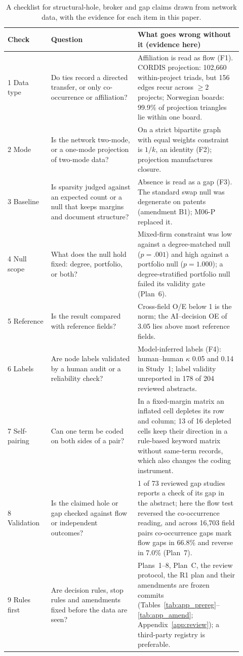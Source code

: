 \begin{table}[tbp]
  \centering
  \caption{A checklist for structural-hole, broker and gap claims drawn from network data, with the evidence for each item in this paper.}
  \label{tab:checklist}
  \footnotesize
  \renewcommand{\arraystretch}{1.15}
  \begin{tabular}{p{0.17\linewidth}p{0.34\linewidth}p{0.41\linewidth}}
    \toprule
    Check & Question & What goes wrong without it (evidence here) \\
    \midrule
    1 Data type & Do ties record a directed transfer, or only co-occurrence or affiliation? & Affiliation is read as flow (F1). CORDIS projection: 102,660 within-project triads, but 156 edges recur across $\geq 2$ projects; Norwegian boards: 99.9\% of projection triangles lie within one board. \\
    2 Mode & Is the network two-mode, or a one-mode projection of two-mode data? & On a strict bipartite graph with equal weights constraint is $1/k$, an identity (F2); projection manufactures closure. \\
    3 Baseline & Is sparsity judged against an expected count or a null that keeps margins and document structure? & Absence is read as a gap (F3). The standard swap null was degenerate on patents (amendment B1); M06-P replaced it. \\
    4 Null scope & What does the null hold fixed: degree, portfolio, or both? & Mixed-firm constraint was low against a degree-matched null ($p=.001$) and high against a portfolio null ($p=1.000$); a degree-stratified portfolio null failed its validity gate (Plan~6). \\
    5 Reference & Is the result compared with reference fields? & Cross-field O/E below 1 is the norm; the AI--decision OE of 3.05 lies above most reference fields. \\
    6 Labels & Are node labels validated by a human audit or a reliability check? & Model-inferred labels (F4): human--human $\kappa$ 0.05 and 0.14 in Study~1; label validity unreported in 178 of 204 reviewed abstracts. \\
    7 Self-pairing & Can one term be coded on both sides of a pair? & In a fixed-margin matrix an inflated cell depletes its row and column; 13 of 16 depleted cells keep their direction in a rule-based keyword matrix without same-term records, which also changes the coding instrument. \\
    8 Validation & Is the claimed hole or gap checked against flow or independent outcomes? & 1 of 73 reviewed gap studies reports a check of its gap in the abstract; here the flow test reversed the co-occurrence reading, and across 16,703 field pairs co-occurrence gaps mark flow gaps in 66.8\% and reverse in 7.0\% (Plan~7). \\
    9 Rules first & Are decision rules, stop rules and amendments fixed before the data are seen? & Plans~1--8, Plan~C, the review protocol, the R1 plan and their amendments are frozen commits (Tables~\ref{tab:app_prereg}--\ref{tab:app_amend}; Appendix~\ref{app:review}); a third-party registry is preferable. \\
    \bottomrule
  \end{tabular}
\end{table}

